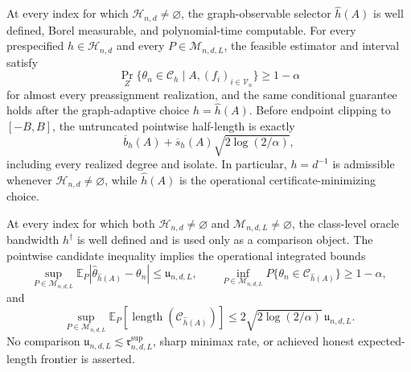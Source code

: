 At every index for which \(\mathcal H_{n,d}\ne\varnothing\), the graph-observable selector \(\widehat h(A)\) is well defined, Borel measurable, and polynomial-time computable.  For every prespecified \(h\in\mathcal H_{n,d}\) and every \(P\in\mathcal M_{n,d,L}\), the feasible estimator and interval satisfy
\[
 \Pr_Z\{\theta_n\in\mathcal C_h\mid A,(f_i)_{i\in\mathcal V_n}\}\geq1-\alpha
\]
for almost every preassignment realization, and the same conditional guarantee holds after the graph-adaptive choice \(h=\widehat h(A)\).  Before endpoint clipping to \([-B,B]\), the untruncated pointwise half-length is exactly
\[
 \overline b_h(A)+\overline s_h(A)\sqrt{2\log(2/\alpha)},
\]
including every realized degree and isolate.  In particular, \(h=d^{-1}\) is admissible whenever \(\mathcal H_{n,d}\ne\varnothing\), while \(\widehat h(A)\) is the operational certificate-minimizing choice.

At every index for which both \(\mathcal H_{n,d}\ne\varnothing\) and \(\mathcal M_{n,d,L}\ne\varnothing\), the class-level oracle bandwidth \(h^\dagger\) is well defined and is used only as a comparison object.  The pointwise candidate inequality implies the operational integrated bounds
\[
 \sup_{P\in\mathcal M_{n,d,L}}
 \mathbb E_P|\widehat\theta_{\widehat h(A)}-\theta_n|
 \leq\mathfrak u_{n,d,L},
 \qquad
 \inf_{P\in\mathcal M_{n,d,L}}
 P\{\theta_n\in\mathcal C_{\widehat h(A)}\}\geq1-\alpha,
\]
and
\[
 \sup_{P\in\mathcal M_{n,d,L}}
 \mathbb E_P[\operatorname{length}(\mathcal C_{\widehat h(A)})]
 \leq2\sqrt{2\log(2/\alpha)}\,\mathfrak u_{n,d,L}.
\]
No comparison \(\mathfrak u_{n,d,L}\lesssim\mathfrak r^{\mathrm{sup}}_{n,d,L}\), sharp minimax rate, or achieved honest expected-length frontier is asserted.